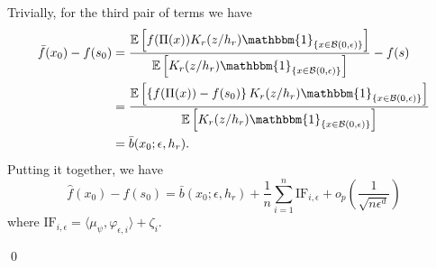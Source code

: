 \documentclass[11pt]{article}
\begin{document}
Trivially, for the third pair of terms we have
\begin{align*}
    \bar{f}(x_0) - f(s_0) &= \frac{\mathbb{E}\left[f(\Pi(x))K_r(z/h_r)\mathbbm{1}_{\{x\in \mathcal{B}(0, \epsilon)\}}\right]}{\mathbb{E}\left[K_r(z/h_r)\mathbbm{1}_{\{x\in \mathcal{B}(0, \epsilon)\}}\right]} - f(s) \\
    &= \frac{\mathbb{E}\left[\left\{f(\Pi(x)) - f(s_0)\right\}K_r(z/h_r)\mathbbm{1}_{\{x\in \mathcal{B}(0, \epsilon)\}}\right]}{\mathbb{E}\left[K_r(z/h_r)\mathbbm{1}_{\{x\in \mathcal{B}(0, \epsilon)\}}\right]}\\
    &= \bar{b}(x_0; \epsilon, h_r).
\end{align*}
Putting it together, we have 
\begin{equation*}
    \hat{f}(x_0) - f(s_0) = \bar{b}(x_0; \epsilon, h_r) + \frac{1}{n}\sum_{i = 1}^n\text{IF}_{i, \epsilon} + o_p\left(\frac{1}{\sqrt{n\epsilon^d}}\right)
\end{equation*}
where $\text{IF}_{i, \epsilon} = \langle \mu_{\psi}, \varphi_{\epsilon, i}\rangle + \zeta_i.$

\qed{}
\end{document}
